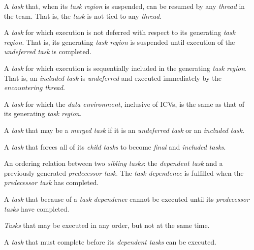 \glossarydefstart
A \emph{task} that, when its \emph{task region} is suspended, can be resumed by any \emph{thread} in 
the team. That is, the \emph{task} is not tied to any \emph{thread}. 
\glossarydefend

\glossarydefstart
A \emph{task} for which execution is not deferred with respect to its generating \emph{task} 
\emph{region}. That is, its generating \emph{task region} is suspended until execution of the 
\emph{undeferred task} is completed.
\glossarydefend

\glossarydefstart
A \emph{task} for which execution is sequentially included in the generating \emph{task region}. 
That is, an \emph{included task} is \emph{undeferred} and executed immediately by the 
\emph{encountering thread}.
\glossarydefend

\glossarydefstart
A \emph{task} for which the \emph{data environment}, inclusive of ICVs, is the same as that of its 
generating \emph{task region}.
\glossarydefend

\glossarydefstart
A \emph{task} that may be a \emph{merged task} if it is an \emph{undeferred task} or an \emph{included task}.
\glossarydefend

\glossarydefstart
A \emph{task} that forces all of its \emph{child tasks} to become \emph{final} and \emph{included tasks}.
\glossarydefend

\glossarydefstart
An ordering relation between two \emph{sibling tasks}: the \emph{dependent task} and a 
previously generated \emph{predecessor task}. The \emph{task dependence} is fulfilled when the 
\emph{predecessor task} has completed.
\glossarydefend

\begin{samepage}
\glossarydefstart
A \emph{task} that because of a \emph{task dependence} cannot be executed until its \emph{predecessor 
tasks} have completed.
\glossarydefend
\end{samepage}

\glossarydefstart
\emph{Tasks} that may be executed in any order, but not at the same
time.
\glossarydefend
\bigskip

\glossarydefstart
A \emph{task} that must complete before its \emph{dependent tasks} can be executed.
\glossarydefend

